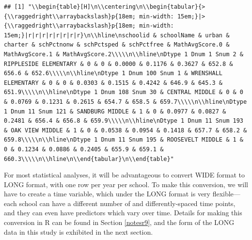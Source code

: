 \documentclass[
]{krantz}
\begin{document}
\begin{verbatim}
## [1] "\\begin{table}[H]\n\\centering\n\\begin{tabular}{>{\\raggedright\\arraybackslash}p{18em; min-width: 15em;}|>{\\raggedright\\arraybackslash}p{18em; min-width: 15em;}|r|r|r|r|r|r|r|r}\n\\hline\nschoolid & schoolName & urban & charter & schPctnonw & schPctsped & schPctfree & MathAvgScore.0 & MathAvgScore.1 & MathAvgScore.2\\\\\n\\hline\nDtype 1 Dnum 1 Snum 2 & RIPPLESIDE ELEMENTARY & 0 & 0 & 0.0000 & 0.1176 & 0.3627 & 652.8 & 656.6 & 652.6\\\\\n\\hline\nDtype 1 Dnum 100 Snum 1 & WRENSHALL ELEMENTARY & 0 & 0 & 0.0303 & 0.1515 & 0.4242 & 646.9 & 645.3 & 651.9\\\\\n\\hline\nDtype 1 Dnum 108 Snum 30 & CENTRAL MIDDLE & 0 & 0 & 0.0769 & 0.1231 & 0.2615 & 654.7 & 658.5 & 659.7\\\\\n\\hline\nDtype 1 Dnum 11 Snum 121 & SANDBURG MIDDLE & 1 & 0 & 0.0977 & 0.0827 & 0.2481 & 656.4 & 656.8 & 659.9\\\\\n\\hline\nDtype 1 Dnum 11 Snum 193 & OAK VIEW MIDDLE & 1 & 0 & 0.0538 & 0.0954 & 0.1418 & 657.7 & 658.2 & 659.8\\\\\n\\hline\nDtype 1 Dnum 11 Snum 195 & ROOSEVELT MIDDLE & 1 & 0 & 0.1234 & 0.0886 & 0.2405 & 655.9 & 659.1 & 660.3\\\\\n\\hline\n\\end{tabular}\n\\end{table}"
\end{verbatim}

For most statistical analyses, it will be advantageous to convert WIDE format to LONG format, with one row per year per school. To make this conversion, we will have to create a time variable, which under the LONG format is very flexible---each school can have a different number of and differently-spaced time points, and they can even have predictors which vary over time. Details for making this conversion in R can be found in Section \ref{notesr9}, and the form of the LONG data in this study is exhibited in the next section.
\end{document}
